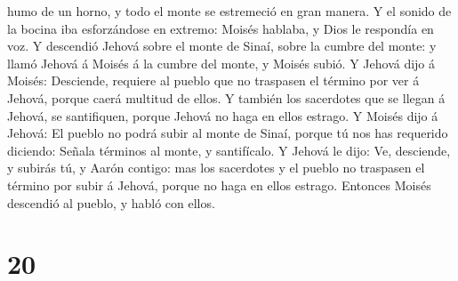 humo de un horno, y todo el monte se estremeció en gran manera.
 Y el sonido de la bocina iba esforzándose en extremo:
Moisés hablaba, y Dios le respondía en voz.  Y descendió
Jehová sobre el monte de Sinaí, sobre la cumbre del monte: y llamó
Jehová á Moisés á la cumbre del monte, y Moisés subió.  Y
Jehová dijo á Moisés: Desciende, requiere al pueblo que no traspasen el
término por ver á Jehová, porque caerá multitud de ellos.
 Y también los sacerdotes que se llegan á Jehová, se
santifiquen, porque Jehová no haga en ellos estrago.  Y
Moisés dijo á Jehová: El pueblo no podrá subir al monte de Sinaí, porque
tú nos has requerido diciendo: Señala términos al monte, y santifícalo.
 Y Jehová le dijo: Ve, desciende, y subirás tú, y Aarón
contigo: mas los sacerdotes y el pueblo no traspasen el término por
subir á Jehová, porque no haga en ellos estrago. 
Entonces Moisés descendió al pueblo, y habló con ellos.

\hypertarget{section-19}{%
\section{20}\label{section-19}}

